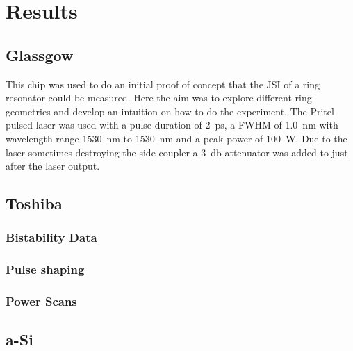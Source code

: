 \newpage
\section{Results}
\subsection{Glassgow}



This chip was used to do an initial proof of concept that the JSI of a ring resonator could be measured. Here the aim was to explore different ring geometries and develop an intuition on how to do the experiment. The Pritel pulsed laser was used with a pulse duration of \SI{2}{\pico\second}, a FWHM of \SI{1.0}{\nano\meter} with wavelength range \SI{1530}{\nano\meter} to \SI{1530}{\nano\meter} and a peak power of \SI{100}{\watt}. Due to the laser sometimes destroying the side coupler a \SI{3}{\decibel} attenuator was added to just after the laser output.


\subsection{Toshiba}


\subsubsection{Bistability Data}
\subsubsection{Pulse shaping}
\subsubsection{Power Scans}
%
\subsection{a-Si}

